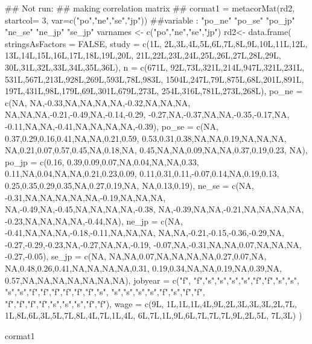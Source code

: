 \documentclass[a4paper]{book}
\begin{document}
\begin{Examples}
\begin{ExampleCode}
## Not run: 
## making correlation matrix ##
cormat1 = metacorMat(rd2, startcol= 3, var=c("po","ne","se","jp"))
 ##variable : "po_ne" "po_se" "po_jp" "ne_se" "ne_jp" "se_jp"
 varnames <- c("po","ne","se","jp")
rd2<- data.frame(
  stringsAsFactors = FALSE,
  study = c(1L,
            2L,3L,4L,5L,6L,7L,8L,9L,10L,11L,12L,
            13L,14L,15L,16L,17L,18L,19L,20L,
            21L,22L,23L,24L,25L,26L,27L,28L,29L,
            30L,31L,32L,33L,34L,35L,36L),
  n = c(671L,
        92L,73L,321L,214L,947L,321L,231L,
        531L,567L,213L,928L,269L,593L,78L,983L,
        1504L,247L,79L,875L,68L,201L,891L,
        197L,431L,98L,179L,69L,301L,679L,273L,
        254L,316L,781L,273L,268L),
  po_ne = c(NA,
            NA,-0.33,NA,NA,NA,NA,-0.32,NA,NA,NA,
            NA,NA,NA,-0.21,-0.49,NA,-0.14,-0.29,
            -0.27,NA,-0.37,NA,NA,-0.35,-0.17,NA,
            -0.11,NA,NA,-0.41,NA,NA,NA,NA,-0.39),
  po_se = c(NA,
            0.37,0.29,0.16,0.41,NA,NA,0.21,0.59,
            0.53,0.31,0.38,NA,NA,0.19,NA,NA,NA,
            NA,0.21,0.07,0.57,0.45,NA,0.18,NA,
            0.45,NA,NA,0.09,NA,NA,0.37,0.19,0.23,
            NA),
  po_jp = c(0.16,
            0.39,0.09,0.07,NA,0.04,NA,NA,0.33,
            0.11,NA,0.04,NA,NA,0.21,0.23,0.09,
            0.11,0.31,0.11,-0.07,0.14,NA,0.19,0.13,
            0.25,0.35,0.29,0.35,NA,0.27,0.19,NA,
            NA,0.13,0.19),
  ne_se = c(NA,
            -0.31,NA,NA,NA,NA,NA,-0.19,NA,NA,NA,
            NA,-0.49,NA,-0.45,NA,NA,NA,NA,-0.38,
            NA,-0.39,NA,NA,-0.21,NA,NA,NA,NA,
            -0.23,NA,NA,NA,NA,-0.44,NA),
  ne_jp = c(NA,
            -0.41,NA,NA,NA,-0.18,-0.11,NA,NA,NA,
            NA,NA,-0.21,-0.15,-0.36,-0.29,NA,
            -0.27,-0.29,-0.23,NA,-0.27,NA,NA,-0.19,
            -0.07,NA,-0.31,NA,NA,0.07,NA,NA,NA,
            -0.27,-0.05),
  se_jp = c(NA,
            NA,NA,0.07,NA,NA,NA,NA,0.27,0.07,NA,
            NA,0.48,0.26,0.41,NA,NA,NA,NA,0.31,
            0.19,0.34,NA,NA,0.19,NA,0.39,NA,
            0.57,NA,NA,NA,NA,NA,NA,NA),
  jobyear = c("f",
              "f","s","s","s","s","f","f","s","s",
              "s","s","f","f","f","f","f","f","s",
              "s","s","s","s","f","s","f","f",
              "f","f","f","f","s","s","s","f","f"),
  wage = c(9L,
           1L,1L,1L,4L,9L,2L,3L,3L,3L,2L,7L,
           1L,8L,6L,3L,5L,7L,8L,4L,7L,1L,4L,
           6L,7L,1L,9L,6L,7L,7L,7L,9L,2L,5L,
           7L,3L)
)

cormat1



\end{ExampleCode}
\end{Examples}
\end{document}

